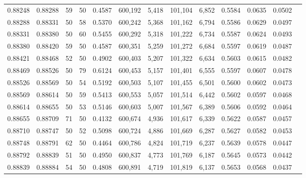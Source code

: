 \begin{tabular}{rrrrrrrrrrrrr}
0.88248 & 0.88288 &    59 &  50 &                                     0.4587 & 600,192 &   5,418 & 101,104 &   6,852 & 0.5584 & 0.0635 & 0.0502 \\
0.88288 & 0.88331 &    50 &  58 &                                     0.5370 & 600,242 &   5,368 & 101,162 &   6,794 & 0.5586 & 0.0629 & 0.0497 \\
0.88331 & 0.88380 &    50 &  60 &                                     0.5455 & 600,292 &   5,318 & 101,222 &   6,734 & 0.5587 & 0.0624 & 0.0493 \\
0.88380 & 0.88420 &    59 &  50 &                                     0.4587 & 600,351 &   5,259 & 101,272 &   6,684 & 0.5597 & 0.0619 & 0.0487 \\
0.88421 & 0.88468 &    52 &  50 &                                     0.4902 & 600,403 &   5,207 & 101,322 &   6,634 & 0.5603 & 0.0615 & 0.0482 \\
0.88469 & 0.88526 &    50 &  79 &                                     0.6124 & 600,453 &   5,157 & 101,401 &   6,555 & 0.5597 & 0.0607 & 0.0478 \\
0.88526 & 0.88569 &    50 &  54 &                                     0.5192 & 600,503 &   5,107 & 101,455 &   6,501 & 0.5600 & 0.0602 & 0.0473 \\
0.88569 & 0.88614 &    50 &  59 &                                     0.5413 & 600,553 &   5,057 & 101,514 &   6,442 & 0.5602 & 0.0597 & 0.0468 \\
0.88614 & 0.88655 &    50 &  53 &                                     0.5146 & 600,603 &   5,007 & 101,567 &   6,389 & 0.5606 & 0.0592 & 0.0464 \\
0.88655 & 0.88709 &    71 &  50 &                                     0.4132 & 600,674 &   4,936 & 101,617 &   6,339 & 0.5622 & 0.0587 & 0.0457 \\
0.88710 & 0.88747 &    50 &  52 &                                     0.5098 & 600,724 &   4,886 & 101,669 &   6,287 & 0.5627 & 0.0582 & 0.0453 \\
0.88748 & 0.88791 &    62 &  50 &                                     0.4464 & 600,786 &   4,824 & 101,719 &   6,237 & 0.5639 & 0.0578 & 0.0447 \\
0.88792 & 0.88839 &    51 &  50 &                                     0.4950 & 600,837 &   4,773 & 101,769 &   6,187 & 0.5645 & 0.0573 & 0.0442 \\
0.88839 & 0.88884 &    54 &  50 &                                     0.4808 & 600,891 &   4,719 & 101,819 &   6,137 & 0.5653 & 0.0568 & 0.0437 \\

\end{tabular}
